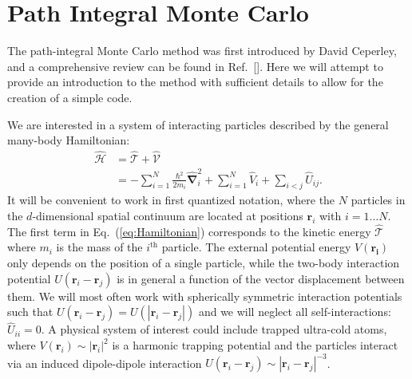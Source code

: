 \documentclass[prb,aps,amssym,nofootinbib,floatfix,notitlepage]{revtex4-1}
\renewcommand{\vec}[1]{\boldsymbol{#1}}
\renewcommand{\eqref}[1]{Eq.~(\ref{#1})}
\begin{document}
\section{Path Integral Monte Carlo}

The path-integral Monte Carlo method was first introduced by David Ceperley, and a
comprehensive review can be found in Ref.~[]. Here
we will attempt to provide an introduction to the method with sufficient
details to allow for the creation of a simple code.

We are interested in a system of interacting particles described by the
general many-body Hamiltonian:
%
\begin{align}
    \hat{\mathcal{H}} &= \hat{\mathcal{T}} + \hat{\mathcal{V}} \nonumber \\
                      &= -\sum_{i=1}^N \frac{\hbar^2}{2m_i} \hat{\vec{\nabla}}_i^2 
    + \sum_{i=1}^N \hat{V}_{i} + \sum_{i < j} \hat{U}_{ij}.
\label{eq:Hamiltonian}
\end{align}
%
It will be convenient to work in first quantized notation, where the $N$
particles in the $d$-dimensional spatial continuum are located at positions
$\vec{r}_i$ with $i=1\ldots N$.  The first term in \eqref{eq:Hamiltonian}
corresponds to the kinetic energy $\hat{\mathcal{T}}$ where $m_i$ is the mass
of the $i^{\text{th}}$ particle. The external potential energy $V(\vec{r_i})$
only depends on the position of a single particle, while the two-body
interaction potential $U(\vec{r}_i-\vec{r}_j)$ is in general a function of the
vector displacement between them.  We will most often work with spherically
symmetric interaction potentials such that $U(\vec{r}_i - \vec{r}_j) =
U(|\vec{r}_i-\vec{r}_j|)$ and we will neglect all self-interactions:
$\hat{U}_{ii} = 0$. A physical system of interest could include trapped
ultra-cold atoms, where $V(\vec{r}_i) \sim |\vec{r}_i|^2$ is a harmonic
trapping potential and the particles interact via an induced dipole-dipole
interaction $U(\vec{r}_i - \vec{r}_j) \sim |\vec{r}_i-\vec{r}_j|^{-3}$.
\end{document}
